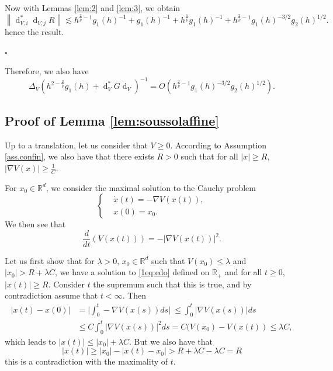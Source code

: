 \documentclass[12pt]{amsart}
\newcommand{\R}{\mathbb R}
\newcommand{\ep}{\hfill $\square$}
\renewcommand{\d}{\operatorname{d}}
\numberwithin{equation}{section}
\numberwithin{figure}{section}
\newcommand{\vvert}[1]{\left\lVert#1\right\rVert}
\begin{document}
Now with Lemmas \ref{lem:2} and \ref{lem:3}, we %
obtain
\begin{equation*}
\vvert{\d_{V,i}^*\d_{V,j}R} \lesssim h^{\frac{2}{\overline{\nu}} - 1}g_1(h)^{-1} + g_1(h)^{-1} + h^{\frac{1}{\overline{\nu}}}g_1(h)^{-1} + h^{\frac{2}{\overline{\nu}} - 1}g_1(h)^{-3/2}g_2(h)^{1/2}.
\end{equation*}
hence %
the result.

\ep

Therefore, we also have
\begin{equation*}
\Delta_V(h^{2-\frac2{\overline{\nu}}}g_1(h) + \d_V^*G\d_V)^{-1} = O(h^{\frac{2}{\overline{\nu}} - 1}g_1(h)^{-3/2}g_2(h)^{1/2}).
\end{equation*}










\subsection{Proof of Lemma \ref{lem:soussolaffine}}\label{sec:proofsoussolaffine}
Up to a translation, let us consider that $V\geq 0$. According to Assumption \ref{ass.confin}, we also have that there exists $R>0$ such that for all $|x|\geq R$, $|\nabla V(x)| \geq \frac1C$.

For $x_0\in\R^d$, we consider the maximal solution to the Cauchy problem
\begin{equation}\label{1eq:edo}
\left\{
\begin{aligned}
&\dot x(t) = -\nabla V(x(t)),
\\&x(0) = x_0.
\end{aligned}
\right.
\end{equation}
We then see that
\begin{equation*}
\frac{d}{dt}(V(x(t))) = -|\nabla V(x(t))|^2.
\end{equation*}

Let us first show that for $\lambda>0$, $x_0\in\R^d$ such that $V(x_0) \leq\lambda$ and $|x_0| > R + \lambda C$, we have a solution to \eqref{1eq:edo} defined on $\R_+$ and for all $t\geq0$, $|x(t)|\geq R$. Consider $t$ the supremum such that this is true, and by contradiction assume that $t<\infty$. Then
\begin{equation*}
\begin{aligned}
    |x(t) - x(0)| &= \big|\int_0^t-\nabla V(x(s))ds\big|\ \leq \int_0^t|\nabla V(x(s))|ds\\
    &\leq C\int_0^t|\nabla V(x(s))|^2ds = C(V(x_0) - V(x(t)) \leq \lambda C,
\end{aligned}
\end{equation*}
which leads to $|x(t)|\leq |x_0| + \lambda C$. But we also have that
\begin{equation*}
|x(t)| \geq |x_0| - |x(t) - x_0| > R + \lambda C - \lambda C = R
\end{equation*}
this is a contradiction with the maximality of $t$.
\end{document}
